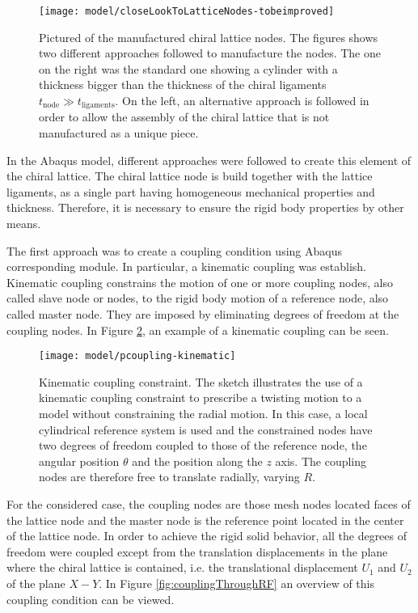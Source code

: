 \begin{figure}[!htpb]
  \centering
  \texttt{[image: model/closeLookToLatticeNodes-tobeimproved]}
  \caption[Pictured of the manufactured chiral lattice nodes]{Pictured of the manufactured chiral lattice nodes. The figures shows two different approaches followed to manufacture the nodes. The one on the right was the standard one showing a cylinder with a thickness bigger than the thickness of the chiral ligaments $t_{\mathrm{node}} \gg t_{\mathrm{ligaments}}$. On the left, an alternative approach is followed in order to allow the assembly of the chiral lattice that is not manufactured as a unique piece. \cite{Vincenz2017}}\label{fig:closeLookToLatticeNodes}
\end{figure}

In the Abaqus model, different approaches were followed to create this element of the chiral lattice. The chiral lattice node is build together with the lattice ligaments, as a single part having homogeneous mechanical properties and thickness. Therefore, it is necessary to ensure the rigid body properties by other means.

The first approach was to create a coupling condition using Abaqus corresponding module. In particular, a kinematic coupling was establish. Kinematic coupling constrains the motion of one or more coupling nodes, also called slave node or nodes, to the rigid body motion of a reference node, also called master node. They are imposed by eliminating degrees of freedom at the coupling nodes. In Figure \ref{fig:kinematicCoupling}, an example of a kinematic coupling can be seen.

\begin{figure}[!htpb]
  \centering
  \texttt{[image: model/pcoupling-kinematic]}
  \caption[Kinematic coupling constraint]{Kinematic coupling constraint. The sketch illustrates the use of a kinematic coupling constraint to prescribe a twisting motion to a model without constraining the radial motion. In this case, a local cylindrical reference system is used and the constrained nodes have two degrees of freedom coupled to those of the reference node, the angular position $\theta$ and the position along the $z$ axis. The coupling nodes are therefore free to translate radially, varying $R$. \cite{Abaqus}}\label{fig:kinematicCoupling}
\end{figure}

For the considered case, the coupling nodes are those mesh nodes located faces of the lattice node and the master node is the reference point located in the center of the lattice node. In order to achieve the rigid solid behavior, all the degrees of freedom were coupled except from the translation displacements in the plane where the chiral lattice is contained, i.e. the translational displacement $U_1$ and $U_2$ of the plane $X-Y$. In Figure \ref{fig:couplingThroughRF} an overview of this coupling condition can be viewed.

